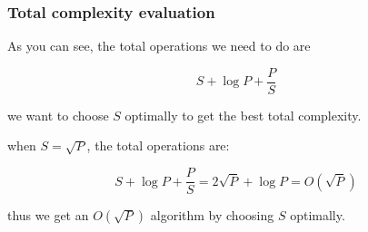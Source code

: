 \begin{frame}
\frametitle{Total complexity evaluation}
As you can see, the total operations we need to do are

\[S + \log P + \frac{P}{S}\]

we want to choose $S$ optimally to get the best total complexity.

\bigskip
when $S = \sqrt{P}$, the total operations are:

\[S + \log P + \frac{P}{S} = 2\sqrt{P} + \log P = O(\sqrt{P})\]

thus we get an $O(\sqrt{P})$ algorithm by choosing $S$ optimally.
\end{frame}
